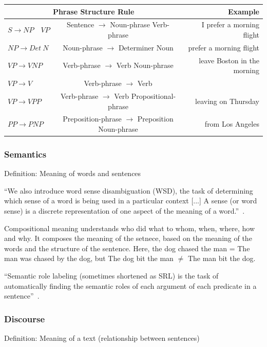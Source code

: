 \documentclass[11pt]{article}
\begin{document}
\begin{tabular}{l c r}
    \hline
    \multicolumn{2}{c}{\textbf{Phrase Structure Rule}} & \textbf{Example} \\
    \hline
    $S \rightarrow NP \quad VP$ & Sentence $\rightarrow$ Noun-phrase Verb-phrase & I prefer a morning flight \\
    $NP \rightarrow Det\ N$ & Noun-phrase $\rightarrow$ Determiner Noun & prefer a morning flight\\
    $VP \rightarrow V NP$ & Verb-phrase $\rightarrow$ Verb Noun-phrase & leave Boston in the morning\\
    $VP \rightarrow V$ & Verb-phrase $\rightarrow$ Verb & \\
    $VP \rightarrow V PP$ & Verb-phrase $\rightarrow$ Verb Propositional-phrase & leaving on Thursday\\
    $PP \rightarrow P NP$ & Preposition-phrase $\rightarrow$ Preposition Noun-phrase & from Los Angeles\\
\end{tabular}

\subsubsection{Semantics}

Definition: Meaning of words and sentences

``We also introduce word sense disambiguation (WSD), the task of determining which sense of a word is being used in a particular context [...] A sense (or word sense) is a discrete representation of one aspect of the meaning of a word.''~\cite{book-speech-and-language-processing}.

Compositional meaning understands who did what to whom, when, where, how and why. It composes the meaning of the setnece, based on the meaning of the words and the structure of the sentence. Here, the dog chased the man = The man was chased by the dog, but The dog bit the man $\neq$ The man bit the dog.

``Semantic role labeling (sometimes shortened as SRL) is the task of automatically finding the semantic roles of each argument of each predicate in a sentence''~\cite{book-speech-and-language-processing}.

\subsubsection{Discourse}

Definition: Meaning of a text (relationship between sentences)
\end{document}
